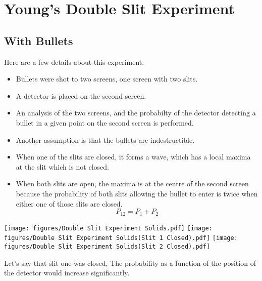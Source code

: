 \documentclass{report}
\begin{document}
\section{Young's Double Slit Experiment}
\subsection{With Bullets}
Here are a few details about this experiment:

\begin{itemize}
	\item Bullets were shot to two screens, one screen with two slits.
	\item A detector is placed on the second screen.
	\item An analysis of the two screens, and the probabilty of the detector detecting a bullet in a given point on the second screen is performed.
	\item Another assumption is that the bullets are indestructible.
	\item When one of the slits are closed, it forms a wave, which has a local maxima at the slit which is not closed.
	\item When both slits are open, the maxima is at the centre of the second screen because the probability of both slits allowing the bullet to enter is twice when either one of those slits are closed.
		\[
			P_{12} = P_1 + P_2
		\]
\end{itemize}
\texttt{[image: figures/Double Slit Experiment Solids.pdf]}
\texttt{[image: figures/Double Slit Experiment Solids(Slit 1 Closed).pdf]}
\texttt{[image: figures/Double Slit Experiment Solids(Slit 2 Closed).pdf]}

Let's say that slit one was closed, The probability as a function of the position of the detector would increase significantly. 
\end{document}
